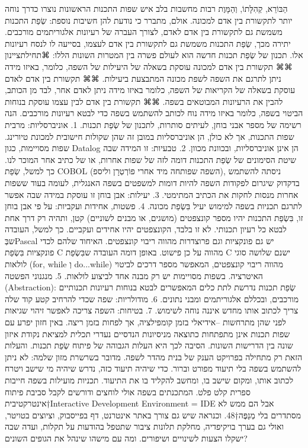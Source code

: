       הַבּוֹרֵא, קְהִלָּתוֹ, וְהַמָּוֶת
      רבות מחשבות בלב איש
      שפות התכנות הראשונות נוצרו כדרך נוחה יותר לתקשורת בין אדם למכונה. אולם, מתברר כי נודעת להן חשיבות נוספת: שְׂפַת התכנות משמשת גם לתקשורת בין אדם לאדם, לצורך העברה של רעיונות אלגוריתמים מורכבים. יתירה מכך, שְׂפַת התכנות משמשת גם לתקשורת בין אדם לעצמו, בסייעה לו לנסח רעיונות אלו.
      תכנון של שְׂפַת תכנות חדשה הוא לעולם פשרה בין המטרות השונות הללו:
      ⌘תחילת{ציינון}
      ⌘⌘ תקשורת בין אדם למכונה עוסקת בשאלה של היעילות של השפה, כלומר, באיזו מידה ניתן לתרגם את השפה לשפת מכונה המתבצעת ביעילות.
      ⌘⌘ תקשורת בין אדם לאדם עוסקת בשאלה של הקריאות של השפה, כלומר באיזו מידה ניתן לאדם אחר, לבד מן הכותב, להבין את הרעיונות המבוטאים בשפה.
      ⌘⌘ תקשורת בין אדם לבין עצמו עוסקת בנוחות הביטוי בשפה, כלומר באיזו מידה נוח לכותב להשתמש בשפה כדי לבטא רעיונות מורכבים.
      הנה רשימה של מספר אבני בוחן, לעיתים סותרות, לתכנון של שְׂפַת תכנות.
      1. אוניברסליות: מרבית שפות התכנות, אך לא כולן, הן אוניברסליות במובן זה שהן שקולות חישובית למכונת טיורינג. שפות מסויימות, כגון Datalog הן אינן אוניברסליות, ובכוונת מכוון.
      2. טבעיות: זו המידה שבה שיטת הסימונים של שְׂפַת התכנות דומה לזה של שפות אחרות, או של כתיב אחר המוכר לנו. כך למשל, שְׂפַת COBOL (השפה שפותחה מיד אחרי פוֹרְטְרָן וליספ), ניסתה להשתמש בדקדוק שיגרום לפקודות השפה להיות דומות למשפטים בשפה האנגלית, לעומה בעוד ששפות אחרות מנסות לחקות את הכתיב המתימטי.
      3. יעילות: אבן בוחן זו עוסקת במידה שבה אפשר לתרגם תכניות בשפה למימוש יעיל בִּשְׂפַת מכונה.
      4. פשטות, אחידות ועקביות: על פי אבן בוחן זו, בִּשְׂפַת התכנות יהיו מספר קונצפטים (מושגים, או מבנים לשוניים) קטן, ותהיה רק דרך אחת לבטא כל רעיון תכנותי. לא זו בלבד, הקונצפטים יהיו אחידים ועקביים. כך למשל, העובדה שבְּPascal יש גם פונקציות וגם פרוצדרות מהווה ריבוי קונצפטים. האיחוד שלהם לכדי פונקציות בִּשְׂפַת C מהווה על כן פישוט. באופן דומה העובדה שבִּשְׂפַת C ישנם שלושה סוגי לולאות (for, while וְ do...while) מהווה ריבוי קונצפטים, המאפשר מספר דרכים לביטוי האיטרציה. בשפות מסויימות יש רק מבנה אחד לביצוע לולאות.
      5. מנגנוני הפשטה (Abstraction): שְׂפַת תכנות נדרשת לתת כלים המאפשרים לבטא בנוחות רעיונות תכנותיים מורכבים, ובכללם אלגוריתמים ומבני נתונים.
      6. מודולריות: שפה שכדי להרחיב קטע קוד שלה צריך לכתוב אותו מחדש איננה נוחה לשימוש.
      7. בטיחות: השפה צריכה לאפשר זיהוי שגיאות לפני שהן מתרחשות –אידיאלי בזמן קומפילציה, אך לפחות בזמן ריצה.
      באין חזון יפרע עם
      שפות תכנות אינן מתפתחות כתוצאה מניסיונות הנדסיים נעדרי תכלית למציאת נקודת איזון שונה בין הדרישות השונות.
      הסיבה לכך היא העלות הגבוהה של פיתוח שְׂפַת תכנות. והעלות הזאת רק מתחילה בפרויקט הענק של בנית מהדר לשפה. מדובר בשרשרת מזון שלמה: לא ניתן להשתמש בשפה בלי תיעוד מפורט וברור. כדי שיהיה תיעוד כזה, נדרש שיהיה מי שישב ויטרח לכתוב אותו, ומקום שישב בו, ומחשב להקליד בו את התיעוד. תכניות מועילות בשפה חייבות ספרית קלט פלט. המתכנתים בשפה אולי לוחצים ודורשים לקבל סביבת פיתוח אינטרקטיבית†{Interactive Development Environment = IDE} אבל הם ממש לא מסתדרים בלי מְנַפֶּה†{48}. וכנראה שיש גם צורך באתר אינטרנט, דף בפייסבוק, וציוצים בטויטר, ואולי גם בערך בויקיפדיה, מחלקת תלונות ציבור שתטפל בהודעות על תקלות, ועדה שבה ישקלו הצעות לשינויים ושיפורים. ומה עם מישהו שינהל את הגופים השונים?
